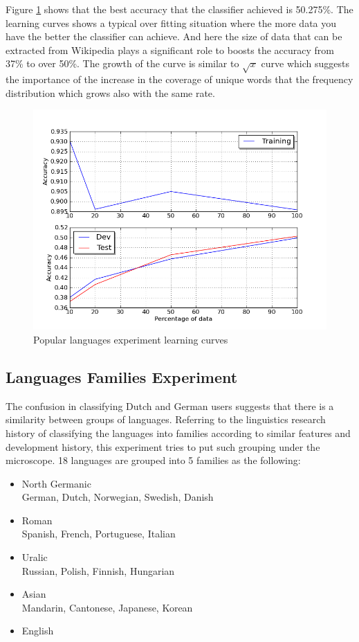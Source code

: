 \documentclass[11pt]{article}
\begin{document}
Figure \ref{pop_lc} shows that the best accuracy that the classifier achieved is 50.275\%. The learning curves shows a typical over fitting situation where the more data you have the better the classifier can achieve. And here the size of data that can be extracted from Wikipedia plays a significant role to boosts the accuracy from 37\% to over 50\%. The growth of the curve is similar to $\sqrt{x}$ curve which suggests the importance of the increase in the coverage of unique words that the frequency distribution which grows also with the same rate.


\begin{figure}[htp]
\centering
\includegraphics[scale=0.45]{popular_lc.png}
\caption{Popular languages experiment learning curves}
\label{pop_lc}
\end{figure}
		
\subsection{Languages Families Experiment}

The confusion in classifying Dutch and German users suggests that there is a similarity between groups of languages. Referring to the linguistics research history of classifying the languages into families according to similar features and development history, this experiment tries to put such grouping under the microscope. 18 languages are grouped into 5 families as the following:
\begin{itemize}
\item North Germanic\\
German, Dutch, Norwegian, Swedish, Danish
\item Roman\\
Spanish, French, Portuguese, Italian
\item Uralic \\
Russian, Polish, Finnish, Hungarian
\item Asian\\
Mandarin, Cantonese, Japanese, Korean
\item English
\end{itemize}
\end{document}
